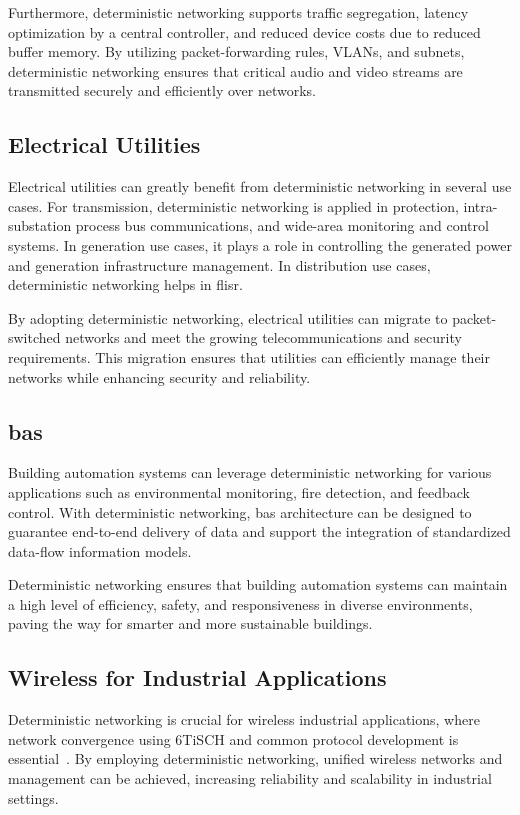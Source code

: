 \documentclass[runningheads]{llncs}
\begin{document}
Furthermore, deterministic networking supports traffic segregation, latency optimization by a central controller, and reduced device costs due to reduced buffer memory. By utilizing packet-forwarding rules, VLANs, and subnets, deterministic networking ensures that critical audio and video streams are transmitted securely and efficiently over networks.

\subsection{Electrical Utilities}
Electrical utilities can greatly benefit from deterministic networking in several use cases. For transmission, deterministic networking is applied in protection, intra-substation process bus communications, and wide-area monitoring and control systems. In generation use cases, it plays a role in controlling the generated power and generation infrastructure management. In distribution use cases, deterministic networking helps in \gls{flisr}.

By adopting deterministic networking, electrical utilities can migrate to packet-switched networks and meet the growing telecommunications and security requirements. This migration ensures that utilities can efficiently manage their networks while enhancing security and reliability.

\subsection{\gls{bas}}
Building automation systems can leverage deterministic networking for various applications such as environmental monitoring, fire detection, and feedback control. With deterministic networking, \gls{bas} architecture can be designed to guarantee end-to-end delivery of data and support the integration of standardized data-flow information models.

Deterministic networking ensures that building automation systems can maintain a high level of efficiency, safety, and responsiveness in diverse environments, paving the way for smarter and more sustainable buildings.

\subsection{Wireless for Industrial Applications}
Deterministic networking is crucial for wireless industrial applications, where network convergence using 6TiSCH and common protocol development is essential~\cite{rfc9023}. By employing deterministic networking, unified wireless networks and management can be achieved, increasing reliability and scalability in industrial settings.
\end{document}
